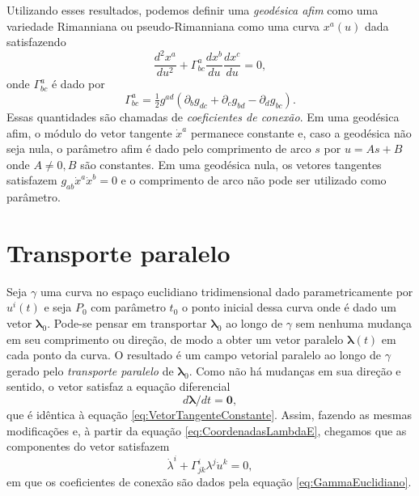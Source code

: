 Utilizando esses resultados, podemos definir uma \textit{geodésica afim} como uma variedade Rimanniana ou pseudo-Rimanniana como uma curva $ x^a(u) $ dada satisfazendo
\begin{equation}\label{eq:GeodesicaAfimPseudoRimanniana}
\boxed{
	\frac{d^{2} x^{a}}{d u^{2}}+\Gamma_{b c}^{a} \frac{d x^{b}}{d u} \frac{d x^{c}}{d u}=0 ,
}
\end{equation}
onde $ \Gamma^{a}_{bc} $ é dado por
\begin{equation}\label{eq:Gamma}
	\boxed{
	\Gamma_{b c}^{a}=\tfrac{1}{2} g^{a d}\left(\partial_{b} g_{d c}+\partial_{c} g_{b d}-\partial_{d} g_{b c}\right) .}
\end{equation}
Essas quantidades são chamadas de \textit{coeficientes de conexão}.
Em uma geodésica afim, o módulo do vetor tangente $ \dot{x}^a $ permanece constante e, caso a geodésica não seja nula, o parâmetro afim é dado pelo comprimento de arco $ s $ por $ u=As+B $ onde $ A\neq0,B $ são constantes. Em uma geodésica nula, os vetores tangentes satisfazem $ g_{a b} \dot{x}^{a} \dot{x}^{b}=0 $ e o comprimento de arco não pode ser utilizado como parâmetro.

\section{Transporte paralelo}\label{sec:TransporteParalelo} %

Seja $ \gamma $ uma curva no espaço euclidiano tridimensional dado parametricamente por $ u^i(t) $ e seja $ P_0 $ com parâmetro $ t_0 $ o ponto inicial dessa curva onde é dado um vetor $ \boldsymbol{\lambda}_0 $. Pode-se pensar em transportar $ \boldsymbol{\lambda}_0 $ ao longo de $ \gamma $ sem nenhuma mudança em seu comprimento ou direção, de modo a obter um vetor paralelo $ \boldsymbol{\lambda}(t) $ em cada ponto da curva. O resultado é um campo vetorial paralelo ao longo de $ \gamma $ gerado pelo \textit{transporte paralelo} de $ \boldsymbol{\lambda}_0 $. Como não há mudanças em sua direção e sentido, o vetor satisfaz a equação diferencial 
\begin{equation}\label{eq:TransporteParalelo}
d \boldsymbol{\lambda} / d t=\mathbf{0}  ,
\end{equation}
que é idêntica à equação \eqref{eq:VetorTangenteConstante}. Assim, fazendo as mesmas modificações e, à partir da equação \eqref{eq:CoordenadasLambdaE}, chegamos que as componentes do vetor satisfazem 
\begin{equation}\label{eq:CoordenadasLambda}
\dot{\lambda}^{i}+\Gamma_{j k}^{i} \lambda^{j} \dot{u}^{k}=0 ,
\end{equation}
em que os coeficientes de conexão são dados pela equação \eqref{eq:GammaEuclidiano}.

